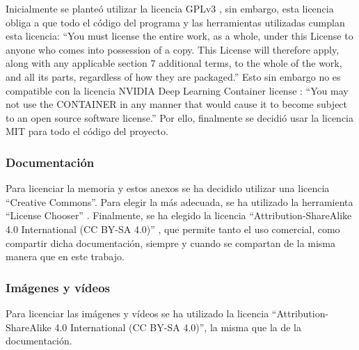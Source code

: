 Inicialmente se planteó utilizar la licencia GPLv3 \cite{gplv3}, sin embargo, esta licencia 
obliga a que todo el código del programa y las herramientas utilizadas cumplan esta licencia: 
``You must license the entire work, as a whole, under this License to anyone who comes into 
possession of a copy. This License will therefore apply, along with any applicable section 
7 additional terms, to the whole of the work, and all its parts, regardless of how they are 
packaged.'' Esto sin embargo no es compatible con la licencia NVIDIA Deep Learning Container license
\cite{nvidia_dl_container_license}: ``You may not use the CONTAINER in any manner that would cause it
to become subject to an open source software license.'' Por ello, finalmente se decidió 
usar la licencia MIT \cite{mit_license} para todo el código del proyecto.

\subsubsection{Documentación}

Para licenciar la memoria y estos anexos se ha decidido utilizar una licencia ``Creative Commons''.
Para elegir la más adecuada, se ha utilizado la herramienta ``License Chooser'' \cite{creativecommons_chooser}.
Finalmente, se ha elegido la licencia ``Attribution-ShareAlike 4.0 International (CC BY-SA 4.0)'' \cite{cc_by_sa_license}, que permite 
tanto el uso comercial, como compartir dicha documentación, siempre y cuando se compartan de la misma manera que 
en este trabajo.

\subsubsection{Imágenes y vídeos}

Para licenciar las imágenes y vídeos se ha utilizado la licencia ``Attribution-ShareAlike 4.0 International (CC BY-SA 4.0)'', 
la misma que la de la documentación.